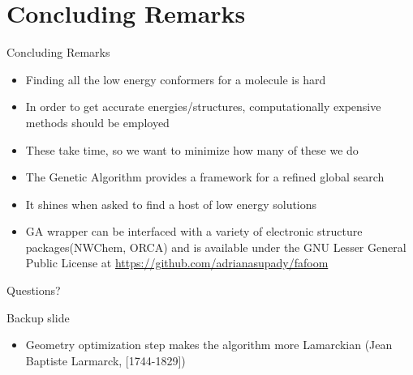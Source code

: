\documentclass[10pt]{beamer}
\begin{document}
\section{Concluding Remarks}

{%
\begin{frame}{Concluding Remarks}
	\begin{itemize}[<+->]
		\item {Finding all the low energy conformers for a molecule is hard}
		\item {In order to get accurate energies/structures, computationally expensive methods should be employed}
		\item {These take time, so we want to minimize how many of these we do}
		\item {The Genetic Algorithm provides a framework for a refined global search}
		\item {It shines when asked to find a host of low energy solutions}
		\item {GA wrapper can be interfaced with a variety of electronic structure packages(NWChem, ORCA) and is available under the GNU Lesser General Public License at \url{https://github.com/adrianasupady/fafoom}}

	\end{itemize}
\end{frame}
}


\begin{frame}[standout]
  Questions?
\end{frame}

\appendix

\begin{frame}[fragile]{Backup slide}
	\begin{itemize}
		\item Geometry optimization step makes the algorithm more Lamarckian (Jean Baptiste Larmarck, [1744-1829])
	\end{itemize}
\end{frame}
\end{document}
